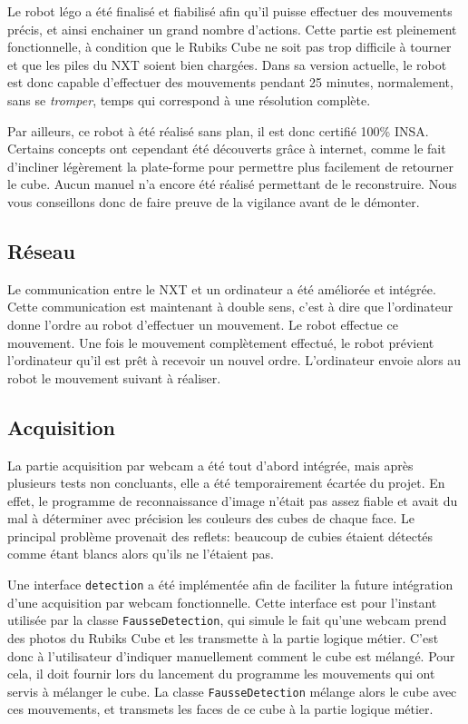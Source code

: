 \documentclass[a4paper,12pt]{article}
\begin{document}
Le robot légo a été finalisé et fiabilisé afin qu'il puisse effectuer des mouvements précis, et ainsi enchainer un grand nombre d'actions. Cette partie est pleinement fonctionnelle, à condition que le Rubiks Cube ne soit pas trop difficile à tourner et que les piles du NXT soient bien chargées. Dans sa version actuelle, le robot est donc capable d'effectuer des mouvements pendant 25 minutes, normalement, sans se \textit{tromper}, temps qui correspond à une résolution complète. 

Par ailleurs, ce robot à été réalisé sans plan, il est donc certifié 100\% INSA. Certains concepts ont cependant été découverts grâce à internet, comme le fait d'incliner légèrement la plate-forme pour permettre plus facilement de retourner le cube. Aucun manuel n'a encore été réalisé permettant de le reconstruire. Nous vous conseillons donc de faire preuve de la vigilance avant de le démonter. 

\subsection{Réseau} 

Le communication entre le NXT et un ordinateur a été améliorée et intégrée. Cette communication est maintenant à double sens, c'est à dire que l'ordinateur donne l'ordre au robot d'effectuer un mouvement. Le robot effectue ce mouvement. Une fois le mouvement complètement effectué, le robot prévient l'ordinateur qu'il est prêt à recevoir un nouvel ordre. L'ordinateur envoie alors au robot le mouvement suivant à réaliser.

\subsection{Acquisition} 

La partie acquisition par webcam a été tout d'abord intégrée, mais après plusieurs tests non concluants, elle a été temporairement écartée du projet. En effet, le programme de reconnaissance d'image n'était pas assez fiable et avait du mal à déterminer avec précision les couleurs des cubes de chaque face. Le principal problème provenait des reflets: beaucoup de cubies étaient détectés comme étant blancs alors qu'ils ne l'étaient pas.

 Une interface \texttt{detection} a été implémentée afin de faciliter la future intégration d'une acquisition par webcam fonctionnelle. Cette interface est pour l'instant utilisée par la classe \texttt{FausseDetection}, qui simule le fait qu'une webcam prend des photos du Rubiks Cube et les transmette à la partie logique métier. C'est donc à l'utilisateur d'indiquer manuellement comment le cube est mélangé. Pour cela, il doit fournir lors du lancement du programme les mouvements qui ont servis à mélanger le cube. La classe \texttt{FausseDetection} mélange alors le cube avec ces mouvements, et transmets les faces de ce cube à la partie logique métier.
 
\end{document}
